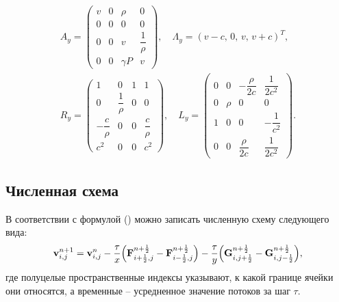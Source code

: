 \documentclass[12pt,a4paper]{article}
\newcommand{\half}{\frac{1}{2}}
\begin{document}
        \begin{equation}
            \label{eigen2d:y}
            \begin{array}{c}
                A_y = \begin{pmatrix}
                    v & 0 & \rho & 0 \\
                    0 & 0 & 0 & 0 \\
                    0 & 0 & v & \dfrac{1}{\rho} \\[2mm]
                    0 & 0 & \gamma P & v
                \end{pmatrix}, \quad 
                \Lambda_y = (v - c,\, 0,\, v,\, v + c)^T, \\[3mm]
                R_y = \begin{pmatrix}
                    1 & 0 & 1 & 1 \\
                    0 & \dfrac{1}{\rho} & 0 & 0 \\
                    -\dfrac{c}{\rho} & 0 & 0 & \dfrac{c}{\rho} \\[2mm]
                    c^2 & 0 & 0 & c^2
                \end{pmatrix}, \quad 
                L_y = \begin{pmatrix}
                    0 & 0 & -\dfrac{\rho}{2c} & \dfrac{1}{2c^2} \\
                    0 & \rho & 0 & 0 \\
                    1 & 0 & 0 & -\dfrac{1}{c^2} \\[3mm]
                    0 & 0 & \dfrac{\rho}{2c} & \dfrac{1}{2c^2}
                \end{pmatrix}.
            \end{array}
        \end{equation}

    \subsection{Численная схема}

    В соответствии с формулой () можно записать численную схему следующего вида:
    \begin{equation}
        \label{system:difference}
        \bold v^{n + 1}_{i, j} = \bold v^{n}_{i, j} - \dfrac{\tau}{\Delta x} \Bigl( \bold F^{n + \half}_{i + \half, j} - \bold F^{n + \half}_{i - \half, j} \Bigr) - \dfrac{\tau}{\Delta y} \Bigl( \bold G^{n + \half}_{i, j + \half} - \bold G^{n + \half}_{i, j - \half} \Bigr),
    \end{equation}
    \noindent где полуцелые пространственные индексы указывают, к какой границе ячейки они относятся, а временные -- усредненное значение потоков за шаг $ \tau $.
\end{document}
